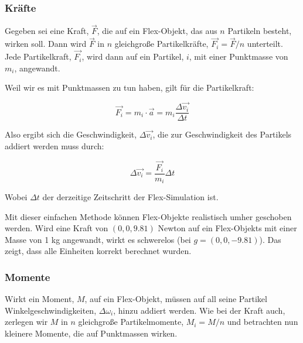 \subsubsection{Kräfte}
Gegeben sei eine Kraft, $\vec{F}$, die auf ein Flex-Objekt, das aus $n$ Partikeln besteht, wirken soll. Dann wird $\vec{F}$ in $n$ gleichgroße Partikelkräfte, $\vec{F_i} = \vec{F} / n$ unterteilt. Jede Partikelkraft, $\vec{F_i}$, wird dann auf ein Partikel, $i$, mit einer Punktmasse von $m_i$, angewandt.

Weil wir es mit Punktmassen zu tun haben, gilt für die Partikelkraft:

\begin{equation}
\vec{F_i} = m_i \cdot \vec{a} = m_i \dfrac{\Delta \vec{v_i}}{\Delta t}
\label{form_F}
\end{equation}

Also ergibt sich die Geschwindigkeit, $\Delta \vec{v_i}$, die zur Geschwindigkeit des Partikels addiert werden muss durch:

\begin{equation}
\Delta \vec{v_i} = \dfrac{\vec{F_i}}{m_i}\Delta t
\label{form_dv}
\end{equation}

Wobei $\Delta t$ der derzeitige Zeitschritt der Flex-Simulation ist. 


Mit dieser einfachen Methode können Flex-Objekte realistisch umher geschoben werden. Wird eine Kraft von $(0 , 0 , 9.81 )$ Newton auf ein Flex-Objekts mit einer Masse von 1 kg angewandt, wirkt es schwerelos (bei $g=(0 , 0 , -9.81 )$). Das zeigt, dass alle Einheiten korrekt berechnet wurden.


\subsubsection{Momente}

Wirkt ein Moment, $M$, auf ein Flex-Objekt, müssen auf all seine Partikel Winkelgeschwindigkeiten, $\Delta \omega_i$, hinzu addiert werden. Wie bei der Kraft auch, zerlegen wir $M$ in $n$ gleichgroße Partikelmomente, $M_i=M/n$ und betrachten nun kleinere Momente, die auf Punktmassen wirken.

